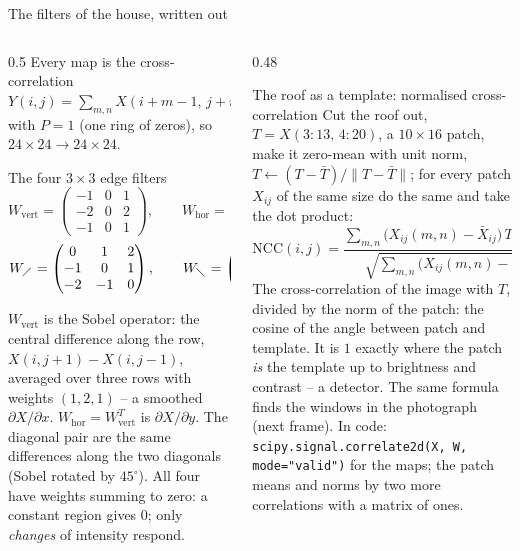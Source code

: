 \documentclass[10pt,aspectratio=169]{beamer}
\begin{document}
\begin{frame}{The filters of the house, written out}
\scriptsize
\begin{columns}[T]
\begin{column}{0.5\textwidth}
Every map is the cross-correlation
$Y(i,j)=\sum_{m,n}X(i+m-1,\,j+n-1)\,W(m,n)$ with $P=1$ (one ring of
zeros), so $24\times24\to24\times24$.
\begin{block}{The four $3\times3$ edge filters}
\[
  W_{\mathrm{vert}}=\begin{pmatrix}-1&0&1\\-2&0&2\\-1&0&1\end{pmatrix},\qquad
  W_{\mathrm{hor}}=\begin{pmatrix}-1&-2&-1\\0&0&0\\1&2&1\end{pmatrix},
\]
\[
  W_{\diagup}=\begin{pmatrix}0&1&2\\-1&0&1\\-2&-1&0\end{pmatrix},\qquad
  W_{\diagdown}=\begin{pmatrix}2&1&0\\1&0&-1\\0&-1&-2\end{pmatrix}.
\]
\end{block}
$W_{\mathrm{vert}}$ is the Sobel operator: the central difference along
the row, $X(i,j+1)-X(i,j-1)$, averaged over three rows with weights
$(1,2,1)$ -- a smoothed $\partial X/\partial x$.
$W_{\mathrm{hor}}=W_{\mathrm{vert}}^{T}$ is $\partial X/\partial y$.  The
diagonal pair are the same differences along the two diagonals (Sobel
rotated by $45^{\circ}$).  All four have weights summing to zero: a
constant region gives $0$; only \emph{changes} of intensity respond.
\end{column}
\begin{column}{0.48\textwidth}
\begin{block}{The roof as a template: normalised cross-correlation}
Cut the roof out, $T=X(3{:}13,\,4{:}20)$, a $10\times16$ patch, make it
zero-mean with unit norm, $T\leftarrow(T-\bar T)/\|T-\bar T\|$; for every
patch $X_{ij}$ of the same size do the same and take the dot product:
\[
  \mathrm{NCC}(i,j)=\frac{\sum_{m,n}\bigl(X_{ij}(m,n)-\bar X_{ij}\bigr)\,T(m,n)}
  {\sqrt{\sum_{m,n}\bigl(X_{ij}(m,n)-\bar X_{ij}\bigr)^{2}}}\in[-1,1].
\]
The cross-correlation of the image with $T$, divided by the norm of the
patch: the cosine of the angle between patch and template.  It is $1$
exactly where the patch \emph{is} the template up to brightness and
contrast -- a detector.  The same formula finds the windows in the
photograph (next frame).  In code: \texttt{scipy.signal.correlate2d(X, W,
mode="valid")} for the maps; the patch means and norms by two more
correlations with a matrix of ones.
\end{block}
\end{column}
\end{columns}
\end{frame}
\end{document}
